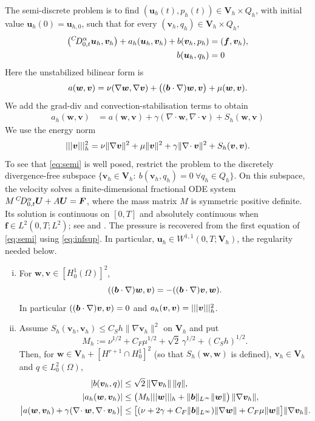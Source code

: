 The semi-discrete problem is to find $(\bm u_h(t),p_h(t))\in\bm V_h\times Q_h$, with initial value $\bm u_h(0)=\bm u_{h,0}$, such that for every $(\bm v_h,q_h)\in\bm V_h\times Q_h$,
\begin{equation}\label{eq:semi}
\begin{aligned}
\bigl({}^{C}\!D_{0,t}^{\alpha}\bm u_h,\bm v_h\bigr)+a_h(\bm u_h,\bm v_h)+b(\bm v_h,p_h)&=(\bm f,\bm v_h),\\
b(\bm u_h,q_h)&=0 
\end{aligned}
\end{equation}
Here the unstabilized bilinear form is
\begin{equation}\label{eq:forms}
a(\bm w,\bm v)=\nu(\nabla\bm w,\nabla\bm v)+\bigl((\boldsymbol b\cdot\nabla)\bm w,\bm v\bigr)+\mu(\bm w,\bm v).
\end{equation}    
We add the grad-div and convection-stabilisation terms to obtain
\begin{align*}
a_h(\bm w,\bm v)&=a(\bm w,\bm v)+\gamma(\nabla\!\cdot\bm w,\nabla\!\cdot\bm v)+S_h(\bm w,\bm v)
\end{align*}
We use the energy norm
\[
|||\bm v|||_h^2=\nu\|\nabla\bm v\|^2+\mu\|\bm v\|^2+\gamma\|\nabla\!\cdot\bm v\|^2+S_h(\bm v,\bm v).
\]
To see that \eqref{eq:semi} is well posed, restrict the problem to the discretely divergence-free subspace $\{\bm v_h\in\bm V_h:\ b(\bm v_h,q_h)=0\ \forall q_h\in Q_h\}$. On this subspace, the velocity solves a finite-dimensional fractional ODE system $M\,{}^{C}\!D_{0,t}^{\alpha}\bm U+A\bm U=\bm F$, where the mass matrix $M$ is symmetric positive definite. Its solution is continuous on $[0,T]$ and absolutely continuous when $\bm f\in L^2(0,T;L^2)$; see \cite[Ch.\ 6]{Die10} and \cite{LL18}. The pressure is recovered from the first equation of \eqref{eq:semi} using \eqref{eq:infsup}. In particular, $\bm u_h\in W^{1,1}(0,T;\bm V_h)$, the regularity needed below.
\begin{lemma}[Coercivity]\label{lem:bounds}
\begin{enumerate}[(i),leftmargin=2.4em]
\item For $\bm w,\bm v\in[H^1_0(\Omega)]^2$,
\[
((\boldsymbol b\cdot\nabla)\bm w,\bm v)=-((\boldsymbol b\cdot\nabla)\bm v,\bm w).
\]
In particular $((\boldsymbol b\cdot\nabla)\bm v,\bm v)=0$ and $a_h(\bm v,\bm v)=|||\bm v|||_h^2$.
\item Assume $S_h(\bm v_h,\bm v_h)\le C_Sh\|\nabla\bm v_h\|^2$ on $\bm V_h$ and put
\[
M_h:=\nu^{1/2}+C_F\mu^{1/2}+\sqrt2\,\gamma^{1/2}+(C_Sh)^{1/2}.
\]
Then, for $\bm w\in\bm V_h+[H^{r+1}\cap H^1_0]^2$ (so that $S_h(\bm w,\bm w)$ is defined), $\bm v_h\in\bm V_h$ and $q\in L^2_0(\Omega)$,
\begin{align}
|b(\bm v_h,q)|&\le\sqrt2\,\|\nabla\bm v_h\|\,\|q\|, \label{eq:b-bound}\\
|a_h(\bm w,\bm v_h)|&\le\bigl(M_h|||\bm w|||_h+\|\boldsymbol b\|_{L^\infty}\|\bm w\|\bigr)\,\|\nabla\bm v_h\|, \label{eq:ah-bound}\\
\bigl|a(\bm w,\bm v_h)+\gamma(\nabla\!\cdot\bm w,\nabla\!\cdot\bm v_h)\bigr|&\le\bigl[(\nu+2\gamma+C_F\|\boldsymbol b\|_{L^\infty})\|\nabla\bm w\|+C_F\mu\|\bm w\|\bigr]\|\nabla\bm v_h\|. \label{eq:a-bound}
\end{align}

\end{enumerate}
\end{lemma}
